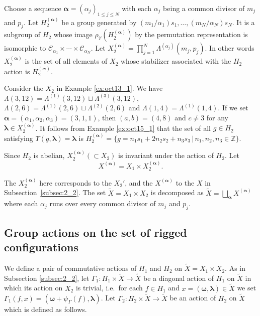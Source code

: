 \documentclass[11pt]{article}
\newcommand{\Z}{{\mathbb Z}}
\newcommand\bom{\boldsymbol{\omega}}
\newcommand\bol{\boldsymbol{\lambda}}
\newcommand\boa{\boldsymbol{\alpha}}
\begin{document}
Choose a sequence $\boa = (\alpha_j)_{1 \leq j \leq N}$ with
each $\alpha_j$ being a common divisor of $m_j$ and $p_j$.
Let $H_2^{(\boa)}$ be a group generated by $(m_1/\alpha_1) s_1, \ldots ,(m_N/\alpha_N) s_N$.
It is a subgroup of $H_2$ whose
image $\rho_{\Upsilon} (H_2^{(\boa)})$ by the permutation representation
is isomorphic to $\mathcal{C}_{\alpha_1} \times \cdots \times \mathcal{C}_{\alpha_N}$.
%
Let
$X_2^{(\boa)} = \prod_{j=1}^N \Lambda^{(\alpha_j)} (m_j,p_j)$.
In other words $X_2^{(\boa)}$ is the set of all elements of $X_2$ whose stabilizer
associated with the $H_2$ action is $H_2^{(\boa)}$.
\begin{example}\label{ex:oct15_2}
Consider the $X_2$ in Example \ref{ex:oct13_1}.
We have $\Lambda (3,12) = \Lambda^{(1)}(3,12) \sqcup \Lambda^{(3)}(3,12)$,
$\Lambda (2,6) = \Lambda^{(1)}(2,6) \sqcup \Lambda^{(2)}(2,6)$ and
$\Lambda (1,4) = \Lambda^{(1)}(1,4)$.
If we set $\boa = (\alpha_1, \alpha_2, \alpha_3) = (3,1,1)$,
then
$(a,b) = (4,8)$ and $c \ne 3$ for any $\bol \in X_2^{(\boa)}$.
It follows from Example \ref{ex:oct15_1} that
the set of all $g \in H_2$ satisfying $\Upsilon (g, \bol) = \bol$
is
$H_2^{(\boa)} = \{ g=  n_1 s_1 + 2 n_2 s_2 + n_3 s_3\, | \,n_1, n_2, n_3 \in \Z \}$.
\end{example}


Since $H_2$ is abelian, $X_2^{(\boa)} (\subset X_2)$ is invariant under the action of $H_2$.
Let
\begin{equation}\label{eq:apr22_2}
X^{(\boa)} = X_1 \times X_2^{(\boa)}.
\end{equation}

The $X_2^{(\boa)}$ here corresponds to the $X_2'$, and the $X^{(\boa)}$ to the $X$ in Subsection~\ref{subsec:2_2}.
The set
$\tilde{X} = X_1 \times X_2$ is decomposed as
\begin{math}
\tilde{X} = \bigsqcup_{\boa} X^{(\boa)}
\end{math}
where each $\alpha_j$ runs over every common divisor of $m_j$ and $p_j$.

\subsection{Group actions on the set of rigged conf\/igurations}\label{subsec:3_3}
We def\/ine a pair of commutative actions of $H_1$ and $H_2$ on $\tilde{X} = X_1 \times X_2$.
As in Subsection \ref{subsec:2_2}, let $\varGamma_1 : H_1 \times \tilde{X} \rightarrow \tilde{X}$
be a diagonal action of
$H_1$ on $\tilde{X}$
in which its action on $X_2$ is trivial, i.e.~for each $f \in H_1$ and $x =(\bom,\bol) \in \tilde{X}$
we set
$\varGamma_1(f, x) = (\bom + \psi_\varGamma (f), \bol)$.
Let
$\varGamma_2 : H_2 \times \tilde{X} \rightarrow \tilde{X}$
be an action of
$H_2$ on $\tilde{X}$
which is def\/ined as follows.
\end{document}

